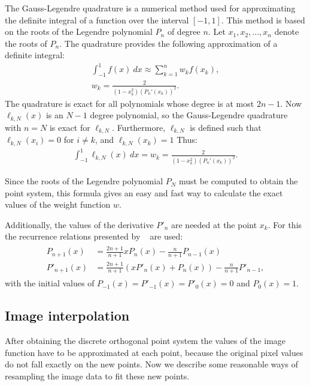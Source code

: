 The Gauss-Legendre quadrature is a numerical method used for approximating the definite integral of a function over the interval $[-1,1]$. This method is based on the roots of the Legendre polynomial $P_n$ of degree $n$. Let $x_1,x_2,\ldots,x_n$ denote the roots of $P_n$. The quadrature provides the following approximation of a definite integral:
\begin{gather*}
    \int_{-1}^{1}f(x)\ dx \approx \sum_{k=1}^n w_k f(x_k), \\
    w_k = \frac{2}{(1-x_k^2)(P_n'(x_k))^2}.
\end{gather*}
The quadrature is exact for all polynomials whose degree is at most $2n-1$. Now $\ell_{k,N}(x)$ is an $N-1$ degree polynomial, so the Gauss-Legendre quadrature with $n=N$ is exact for $\ell_{k,N}$. Furthermore, $\ell_{k,N}$ is defined such that $\ell_{k,N}(x_i) = 0$ for $i \neq k$, and $\ell_{k,N}(x_k) = 1$ Thus:
\begin{gather*}
    \int_{-1}^{1}\ell_{k,N}(x)\ dx = w_k = \frac{2}{(1-x_k^2)(P_n'(x_k))^2}.
\end{gather*}

Since the roots of the Legendre polynomial $P_N$ must be computed to obtain the point system, this formula gives an easy and fast way to calculate the exact values of the weight function $w$.


Additionally, the values of the derivative $P'_n$ are needed at the point $x_k$. For this the recurrence relations presented by \citeauthor{legendre_algo}~\cite{legendre_algo} are used:
\begin{gather*}
    \begin{split}
        P_{n+1}(x) &= \frac{2n + 1}{n + 1}xP_n(x) - \frac{n}{n + 1}P_{n-1}(x)\\
        P'_{n+1}(x) &= \frac{2n + 1}{n + 1}(xP'_n(x) + P_n(x)) - \frac{n}{n+1}P'_{n-1},
    \end{split}
\end{gather*}
with the initial values of $P_{-1}(x) = P'_{-1}(x) = P'_0(x) = 0$ and $P_0(x) = 1$.

\subsection{Image interpolation}
After obtaining the discrete orthogonal point system the values of the image function have to be approximated at each point, because the original pixel values do not fall exactly on the new points. Now we describe some reasonable ways of resampling the image data to fit these new points.

